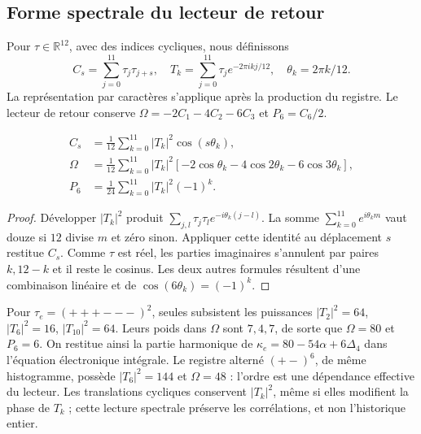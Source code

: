 \subsection{Forme spectrale du lecteur de retour}
Pour $\tau\in\mathbb R^{12}$, avec des indices cycliques, nous définissons
\begin{equation}
 C_s=\sum_{j=0}^{11}\tau_j\tau_{j+s},\quad
 T_k=\sum_{j=0}^{11}\tau_j e^{-2\pi i kj/12},\quad
 \theta_k=2\pi k/12.
 \label{md:r27:fourier}
\end{equation}
La représentation par caractères s'applique après la production du registre. Le lecteur de retour conserve $\Omega=-2C_1-4C_2-6C_3$ et $P_6=C_6/2$.
\begin{proposition}
\begin{equation}
 \begin{split}
 C_s&=\frac1{12}\sum_{k=0}^{11}|T_k|^2\cos(s\theta_k),\\
 \Omega&=\frac1{12}\sum_{k=0}^{11}|T_k|^2
 [-2\cos\theta_k-4\cos2\theta_k-6\cos3\theta_k],\\
 P_6&=\frac1{24}\sum_{k=0}^{11}|T_k|^2(-1)^k.
 \end{split}
 \label{md:r27:espectro}
\end{equation}
\end{proposition}
\begin{proof}
Développer $|T_k|^2$ produit $\sum_{j,l}\tau_j\tau_l e^{-i\theta_k(j-l)}$. La somme $\sum_{k=0}^{11}e^{i\theta_km}$ vaut douze si $12$ divise $m$ et zéro sinon. Appliquer cette identité au déplacement $s$ restitue $C_s$. Comme $\tau$ est réel, les parties imaginaires s'annulent par paires $k,12-k$ et il reste le cosinus. Les deux autres formules résultent d'une combinaison linéaire et de $\cos(6\theta_k)=(-1)^k$.
\end{proof}
Pour $\tau_e=(+++---)^2$, seules subsistent les puissances $|T_2|^2=64$, $|T_6|^2=16$, $|T_{10}|^2=64$. Leurs poids dans $\Omega$ sont $7,4,7$, de sorte que $\Omega=80$ et $P_6=6$. On restitue ainsi la partie harmonique de $\kappa_e=80-54\alpha+6\Delta_4$ dans l'équation électronique intégrale. Le registre alterné $(+-)^6$, de même histogramme, possède $|T_6|^2=144$ et $\Omega=48$ : l'ordre est une dépendance effective du lecteur. Les translations cycliques conservent $|T_k|^2$, même si elles modifient la phase de $T_k$ ; cette lecture spectrale préserve les corrélations, et non l'historique entier.

